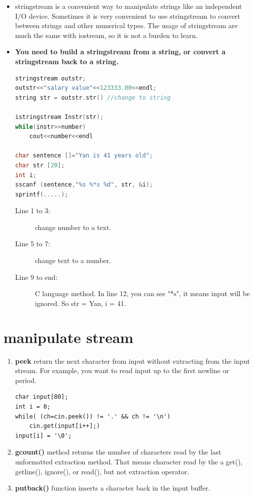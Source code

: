 \documentclass[a4paper,11pt,twoside]{book}
\begin{document}
\begin{itemize}
	\item stringstream is a convenient way to manipulate strings like an independent I/O device. Sometimes it is very convenient to use stringstream to convert between strings and other numerical types. The usage of stringstream are much the same with iostream, so it is not a burden to learn.  
	
	\item \textbf{You need to build a stringstream from a string, or convert a stringstream back to a string.}
	
\begin{lstlisting}[frame=single, language=c++]
stringstream outstr;
outstr<<"salary value"<<123333.00<<endl;
string str = outstr.str() //change to string
	
istringstream Instr(str);
while(instr>>number)
	cout<<number<<endl
	
char sentence []="Yan is 41 years old";
char str [20];
int i;
sscanf (sentence,"%s %*s %d", str, &i);
sprintf(.....);
\end{lstlisting}
\begin{description}
	\item[Line 1 to 3:] change number to a text.
	\item[Line 5 to 7:] change text to a number.
	\item[Line 9 to end:] C language method. In line 12, you can see "*s", it means input will be ignored. So str = Yan, i = 41.
\end{description}
	
\end{itemize}

\section{manipulate stream}
\begin{enumerate}
	\item \textbf{peek} return the next character from input without extracting from the input stream. For example, you want to read input up to the first newline or period.
\begin{lstlisting}[numbers=none]
char input[80];
int i = 0;
while( (ch=cin.peek()) != '.' && ch != '\n')
	cin.get(input[i++];)
input[i] = '\0';
\end{lstlisting}
	
	\item \textbf{gcount()} method returns the number of characters read by the last unformatted extraction method. That means character read by the a get(), getline(), ignore(), or read(), but not extraction operator.
	
	\item \textbf{putback()} function inserts a character back in the input buffer.
\end{enumerate}
\end{document}
